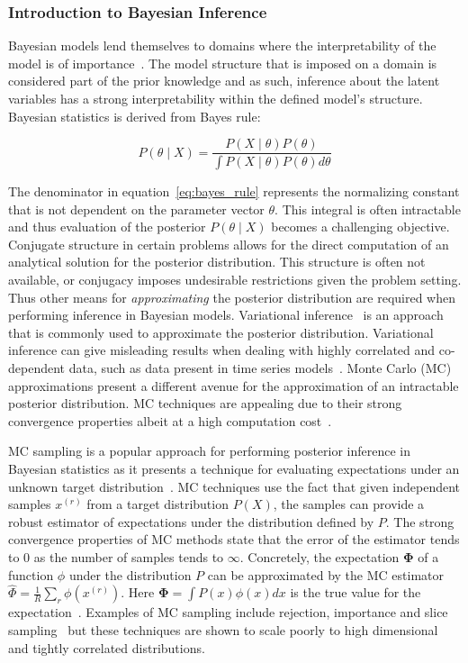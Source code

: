 \subsubsection{Introduction to Bayesian Inference}

Bayesian models lend themselves to domains where the interpretability of the model is of importance~\citep{gelman2014bayesian}. The model structure that is imposed on a domain is considered part of the prior knowledge and as such, inference about the latent variables has a strong interpretability within the defined model's structure. Bayesian statistics is derived from Bayes rule:

\begin{equation}\label{eq:bayes_rule}
	P(\theta \mid X) = \frac{P(X \mid \theta)P(\theta)}{\int P(X \mid \theta)P(\theta) d\theta}
\end{equation}

The denominator in equation~\ref{eq:bayes_rule} represents the normalizing constant that is not dependent on the parameter vector $\theta$. This integral is often intractable and thus evaluation of the posterior $P(\theta \mid X)$ becomes a challenging objective. Conjugate structure in certain problems allows for the direct computation of an analytical solution for the posterior distribution. This structure is often not available, or conjugacy imposes undesirable restrictions given the problem setting. Thus other means for \textit{approximating} the posterior distribution are required when performing inference in Bayesian models. Variational inference~\citep{attias2000variational,saul1996exploiting,saul1996mean,blei2003latent} is an approach that is commonly used to approximate the posterior distribution. Variational inference can give misleading results when dealing with highly correlated and co-dependent data, such as data present in time series models~\citep{turner2011two}. Monte Carlo (MC) approximations present a different avenue for the approximation of an intractable posterior distribution. MC techniques are appealing due to their strong convergence properties albeit at a high computation cost~\citep{mackay1998introduction}.

MC sampling is a popular approach for performing posterior inference in Bayesian statistics as it presents a technique for evaluating expectations under an unknown target distribution~\citep{mackay1998introduction}. MC techniques use the fact that given independent samples $x^{(r)}$ from a target distribution $P(X)$, the samples can provide a robust estimator of expectations under the distribution defined by $P$. The strong convergence properties of MC methods state that the error of the estimator tends to $0$ as the number of samples tends to $\infty$. Concretely, the expectation $\mathbf{\Phi}$ of a function $\phi$ under the distribution $P$ can be approximated by the MC estimator $\hat{\Phi} = \frac{1}{R}\sum\limits_r \phi(x^{(r)})$. Here $\mathbf{\Phi} = \int P(x)\phi(x) dx$ is the true value for the expectation~\citep{mackay1998introduction}. Examples of MC sampling include rejection, importance and slice sampling~\citep{neal2003slice} but these techniques are shown to scale poorly to high dimensional and tightly correlated distributions.

